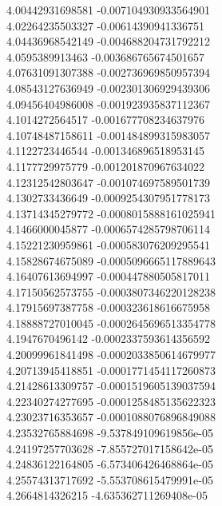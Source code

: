 {4.00442931698581 -0.007104930933564901 \\
4.02264235503327 -0.00614390941336751 \\
4.04436968542149 -0.004688204731792212 \\
4.0595389913463 -0.003686765674501657 \\
4.07631091307388 -0.002736969850957394 \\
4.08543127636949 -0.002301306929439306 \\
4.09456404986008 -0.001923935837112367 \\
4.1014272564517 -0.001677708234637976 \\
4.10748487158611 -0.001484899315983057 \\
4.1122723446544 -0.001346896518953145 \\
4.1177729975779 -0.001201870967634022 \\
4.12312542803647 -0.001074697589501739 \\
4.1302733436649 -0.0009254307951778173 \\
4.13714345279772 -0.0008015888161025941 \\
4.1466000045877 -0.0006574285798706114 \\
4.15221230959861 -0.000583076209295541 \\
4.15828674675089 -0.0005096665117889643 \\
4.16407613694997 -0.000447880505817011 \\
4.17150562573755 -0.0003807346220128238 \\
4.17915697387758 -0.000323618616675958 \\
4.18888727010045 -0.0002645696513354778 \\
4.1947670496142 -0.0002337593614356592 \\
4.20099961841498 -0.0002033850614679977 \\
4.20713945418851 -0.0001771454117260873 \\
4.21428613309757 -0.0001519605139037594 \\
4.22340274277695 -0.0001258485135622323 \\
4.23023716353657 -0.0001088076896849088 \\
4.23532765884698 -9.537849109619856e-05 \\
4.24197257703628 -7.855727017158642e-05 \\
4.24836122164805 -6.573406426468864e-05 \\
4.25574313717692 -5.553708615479991e-05 \\
4.2664814326215 -4.635362711269408e-05 \\
}
